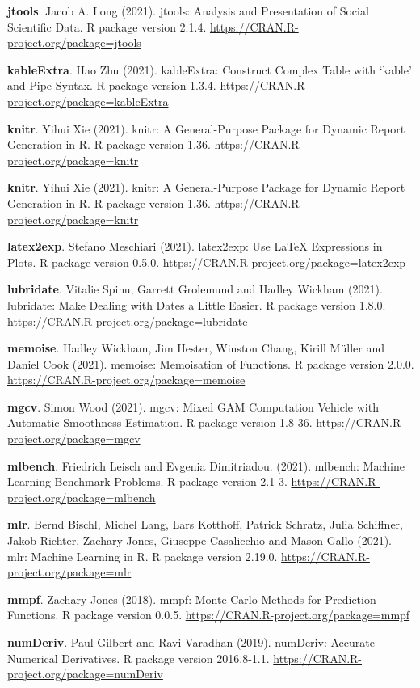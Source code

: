 \documentclass[
  12pt,
]{krantz}
\begin{document}
\textbf{jtools}. Jacob A. Long (2021). jtools: Analysis and Presentation of Social Scientific Data. R package version 2.1.4. \url{https://CRAN.R-project.org/package=jtools}

\textbf{kableExtra}. Hao Zhu (2021). kableExtra: Construct Complex Table with `kable' and Pipe Syntax. R package version 1.3.4. \url{https://CRAN.R-project.org/package=kableExtra}

\textbf{knitr}. Yihui Xie (2021). knitr: A General-Purpose Package for Dynamic Report Generation in R. R package version 1.36. \url{https://CRAN.R-project.org/package=knitr}

\textbf{knitr}. Yihui Xie (2021). knitr: A General-Purpose Package for Dynamic Report Generation in R. R package version 1.36. \url{https://CRAN.R-project.org/package=knitr}

\textbf{latex2exp}. Stefano Meschiari (2021). latex2exp: Use LaTeX Expressions in Plots. R package version 0.5.0. \url{https://CRAN.R-project.org/package=latex2exp}

\textbf{lubridate}. Vitalie Spinu, Garrett Grolemund and Hadley Wickham (2021). lubridate: Make Dealing with Dates a Little Easier. R package version 1.8.0. \url{https://CRAN.R-project.org/package=lubridate}

\textbf{memoise}. Hadley Wickham, Jim Hester, Winston Chang, Kirill Müller and Daniel Cook (2021). memoise: Memoisation of Functions. R package version 2.0.0. \url{https://CRAN.R-project.org/package=memoise}

\textbf{mgcv}. Simon Wood (2021). mgcv: Mixed GAM Computation Vehicle with Automatic Smoothness
Estimation. R package version 1.8-36. \url{https://CRAN.R-project.org/package=mgcv}

\textbf{mlbench}. Friedrich Leisch and Evgenia Dimitriadou. (2021). mlbench: Machine Learning Benchmark Problems. R package version 2.1-3. \url{https://CRAN.R-project.org/package=mlbench}

\textbf{mlr}. Bernd Bischl, Michel Lang, Lars Kotthoff, Patrick Schratz, Julia Schiffner, Jakob Richter, Zachary Jones, Giuseppe Casalicchio and Mason Gallo (2021). mlr: Machine Learning in R. R package version 2.19.0. \url{https://CRAN.R-project.org/package=mlr}

\textbf{mmpf}. Zachary Jones (2018). mmpf: Monte-Carlo Methods for Prediction Functions. R package version 0.0.5. \url{https://CRAN.R-project.org/package=mmpf}

\textbf{numDeriv}. Paul Gilbert and Ravi Varadhan (2019). numDeriv: Accurate Numerical Derivatives. R package version 2016.8-1.1. \url{https://CRAN.R-project.org/package=numDeriv}
\end{document}
